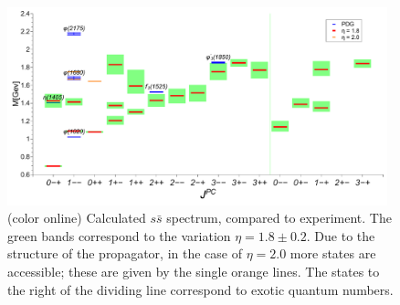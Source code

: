 \begin{figure}[tp]
\begin{center}
\includegraphics[width=0.98\textwidth]{figures/spectrum_ss}
\caption{(color online) Calculated $s\bar{s}$ spectrum, compared to experiment. The green bands correspond to the 
variation $\eta=1.8\pm0.2$. Due to the structure of the propagator, in the case of $\eta=2.0$ more states are accessible; 
these are given by the single orange lines. The states to the right of the dividing line correspond to exotic quantum 
numbers.}\label{fig:spectrumss}
\end{center}
\end{figure}

